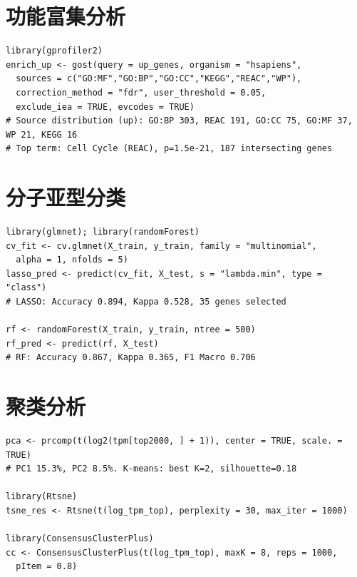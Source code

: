 \documentclass[12pt,a4paper,openany]{ctexbook}
\begin{document}
\section{功能富集分析}
\begin{lstlisting}[caption={g:Profiler功能富集}, basicstyle=\ttfamily\scriptsize]
library(gprofiler2)
enrich_up <- gost(query = up_genes, organism = "hsapiens",
  sources = c("GO:MF","GO:BP","GO:CC","KEGG","REAC","WP"),
  correction_method = "fdr", user_threshold = 0.05,
  exclude_iea = TRUE, evcodes = TRUE)
# Source distribution (up): GO:BP 303, REAC 191, GO:CC 75, GO:MF 37, WP 21, KEGG 16
# Top term: Cell Cycle (REAC), p=1.5e-21, 187 intersecting genes
\end{lstlisting}

\section{分子亚型分类}
\begin{lstlisting}[caption={LASSO与随机森林分类}, basicstyle=\ttfamily\scriptsize]
library(glmnet); library(randomForest)
cv_fit <- cv.glmnet(X_train, y_train, family = "multinomial",
  alpha = 1, nfolds = 5)
lasso_pred <- predict(cv_fit, X_test, s = "lambda.min", type = "class")
# LASSO: Accuracy 0.894, Kappa 0.528, 35 genes selected

rf <- randomForest(X_train, y_train, ntree = 500)
rf_pred <- predict(rf, X_test)
# RF: Accuracy 0.867, Kappa 0.365, F1 Macro 0.706
\end{lstlisting}

\section{聚类分析}
\begin{lstlisting}[caption={PCA/t-SNE/K-means/共识聚类}, basicstyle=\ttfamily\scriptsize]
pca <- prcomp(t(log2(tpm[top2000, ] + 1)), center = TRUE, scale. = TRUE)
# PC1 15.3%, PC2 8.5%. K-means: best K=2, silhouette=0.18

library(Rtsne)
tsne_res <- Rtsne(t(log_tpm_top), perplexity = 30, max_iter = 1000)

library(ConsensusClusterPlus)
cc <- ConsensusClusterPlus(t(log_tpm_top), maxK = 8, reps = 1000,
  pItem = 0.8)
\end{lstlisting}
\end{document}
